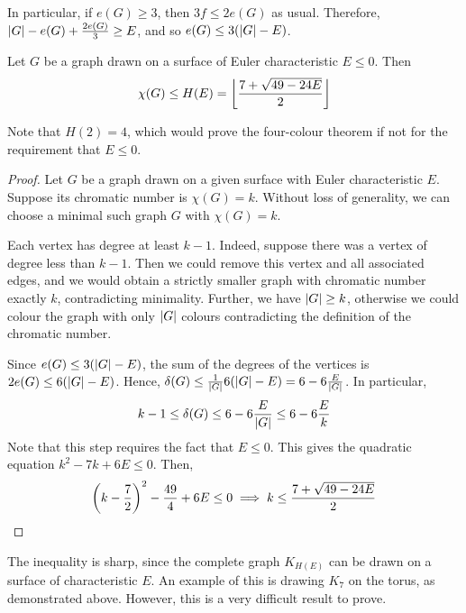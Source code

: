 In particular, if \( e(G) \geq 3 \), then \( 3f \leq 2e(G) \) as usual.
Therefore, \( \abs{G} - e(G) + \frac{2e(G)}{3} \geq E \), and so \( e(G) \leq 3(\abs{G} - E) \).
\begin{theorem}[Heawood]
	Let \( G \) be a graph drawn on a surface of Euler characteristic \( E \leq 0 \).
	Then
	\[ \chi(G) \leq H(E) = \floor*{\frac{7+\sqrt{49-24E}}{2}} \]
\end{theorem}
\begin{remark}
	Note that \( H(2) = 4 \), which would prove the four-colour theorem if not for the requirement that \( E \leq 0 \).
\end{remark}
\begin{proof}
	Let \( G \) be a graph drawn on a given surface with Euler characteristic \( E \).
	Suppose its chromatic number is \( \chi(G) = k \).
	Without loss of generality, we can choose a minimal such graph \( G \) with \( \chi(G) = k \).

	Each vertex has degree at least \( k - 1 \).
	Indeed, suppose there was a vertex of degree less than \( k - 1 \).
	Then we could remove this vertex and all associated edges, and we would obtain a strictly smaller graph with chromatic number exactly \( k \), contradicting minimality.
	Further, we have \( \abs{G} \geq k \), otherwise we could colour the graph with only \( \abs{G} \) colours contradicting the definition of the chromatic number.

	Since \( e(G) \leq 3(\abs{G} - E) \), the sum of the degrees of the vertices is \( 2e(G) \leq 6(\abs{G} - E) \).
	Hence, \( \delta(G) \leq \frac{1}{\abs{G}} 6(\abs{G} - E) = 6 - 6\frac{E}{\abs{G}} \).
	In particular,
	\[ k - 1 \leq \delta(G) \leq 6 - 6\frac{E}{\abs{G}} \leq 6 - 6\frac{E}{k} \]
	Note that this step requires the fact that \( E \leq 0 \).
	This gives the quadratic equation \( k^2 - 7k + 6E \leq 0 \).
	Then,
	\[ \qty(k - \frac{7}{2})^2 - \frac{49}{4} + 6E \leq 0 \implies k \leq \frac{7 + \sqrt{49 - 24E}}{2} \]
\end{proof}
\begin{remark}
	The inequality is sharp, since the complete graph \( K_{H(E)} \) can be drawn on a surface of characteristic \( E \).
	An example of this is drawing \( K_7 \) on the torus, as demonstrated above.
	However, this is a very difficult result to prove.
\end{remark}
